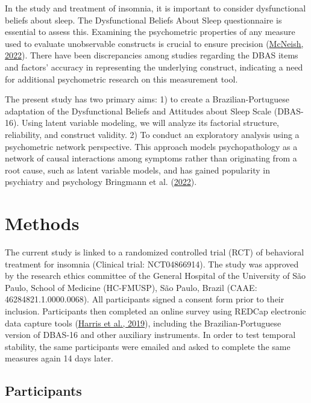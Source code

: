 \documentclass[
  ,doc,11pt, twoside,floatsintext]{apa6}
\begin{document}
In the study and treatment of insomnia, it is important to consider dysfunctional beliefs about sleep. The Dysfunctional Beliefs About Sleep questionnaire is essential to assess this. Examining the psychometric properties of any measure used to evaluate unobservable constructs is crucial to ensure precision (\protect\hyperlink{ref-mcneish2022a}{McNeish, 2022}). There have been discrepancies among studies regarding the DBAS items and factors' accuracy in representing the underlying construct, indicating a need for additional psychometric research on this measurement tool.

The present study has two primary aims: 1) to create a Brazilian-Portuguese adaptation of the Dysfunctional Beliefs and Attitudes about Sleep Scale (DBAS-16). Using latent variable modeling, we will analyze its factorial structure, reliability, and construct validity. 2) To conduct an exploratory analysis using a psychometric network perspective. This approach models psychopathology as a network of causal interactions among symptoms rather than originating from a root cause, such as latent variable models, and has gained popularity in psychiatry and psychology Bringmann et al. (\protect\hyperlink{ref-bringmann2022}{2022}).

\hypertarget{methods}{%
\section{Methods}\label{methods}}

The current study is linked to a randomized controlled trial (RCT) of behavioral treatment for insomnia (Clinical trial: NCT04866914). The study was approved by the research ethics committee of the General Hospital of the University of São Paulo, School of Medicine (HC-FMUSP), São Paulo, Brazil (CAAE: 46284821.1.0000.0068). All participants signed a consent form prior to their inclusion. Participants then completed an online survey using REDCap electronic data capture tools (\protect\hyperlink{ref-harris2019redcap}{Harris et al., 2019}), including the Brazilian-Portuguese version of DBAS-16 and other auxiliary instruments. In order to test temporal stability, the same participants were emailed and asked to complete the same measures again 14 days later.

\hypertarget{participants}{%
\subsection{Participants}\label{participants}}
\end{document}
